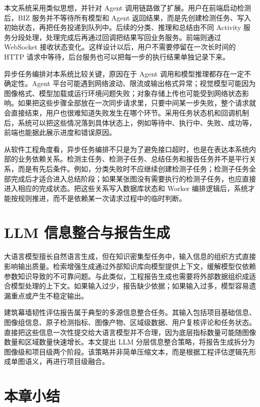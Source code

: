 本文系统采用类似思想，并针对 Agent 调用链路做了扩展。用户在前端启动检测后，BIZ 服务并不等待所有模型和 Agent 返回结果，而是先创建检测任务、写入初始状态，再把任务投递到队列中。后续的分类、推理和总结由不同 Activity 服务分段处理，处理完成后再通过回调把结果写回业务服务。前端则通过 WebSocket 接收状态变化。这样设计以后，用户不需要停留在一次长时间的 HTTP 请求中等待，后台服务也可以把每一步的执行结果单独记录下来。

异步任务编排对本系统比较关键，原因在于 Agent 调用和模型推理都存在一定不确定性。Agent 平台可能遇到网络波动、限流或输出格式异常；视觉模型可能因为图像格式、模型加载或运行环境问题失败；对象存储上传也可能受到网络状态影响。如果把这些步骤全部放在一次同步请求里，只要中间某一步失败，整个请求就会直接结束，用户也很难知道失败发生在哪个环节。采用任务状态机和回调机制后，系统可以把这些情况落到具体状态上，例如等待中、执行中、失败、成功等，前端也能据此展示进度和错误原因。

从软件工程角度看，异步任务编排不只是为了避免接口超时，也是在表达本系统内部的业务依赖关系。检测主任务、检测子任务、总结任务和报告任务并不是平行关系，而是有先后条件。例如，分类失败时不应继续创建检测子任务；检测子任务全部完成后才适合进入总结阶段；如果某张图没有需要执行的检测子任务，也应直接进入相应的完成状态。把这些关系写入数据库状态和 Worker 编排逻辑后，系统才能按规则推进，而不是依赖某一次请求过程中的临时判断。

\section{LLM 信息整合与报告生成}
\label{sec:foundation-large-language-model-information-integration-and-report-generation}

大语言模型擅长自然语言生成，但在知识密集型任务中，输入信息的组织方式直接影响输出质量。检索增强生成通过外部知识库向模型提供上下文，缓解模型仅依赖参数知识导致的不可靠问题\cite{lewis2020rag}。与此类似，工程报告生成也需要将外部数据组织成适合模型处理的上下文。如果输入过少，报告缺少依据；如果输入过多，模型容易遗漏重点或产生不稳定输出。

建筑幕墙韧性评估报告属于典型的多源信息整合任务。其输入包括项目基础信息、图像组信息、原子检测指标、图像产物、区域级数据、用户复核评论和任务状态。直接把这些信息一次性提交给大语言模型并不合理，因为底层指标数量可能随图像数量和区域数量快速增长。本文提出 LLM 分层信息整合策略，将报告生成拆分为图像级和项目级两个阶段。该策略并非简单压缩文本，而是根据工程评估逻辑先形成单图语义，再进行项目级融合。

\section{本章小结}
\label{sec:foundation-chapter-summary}

